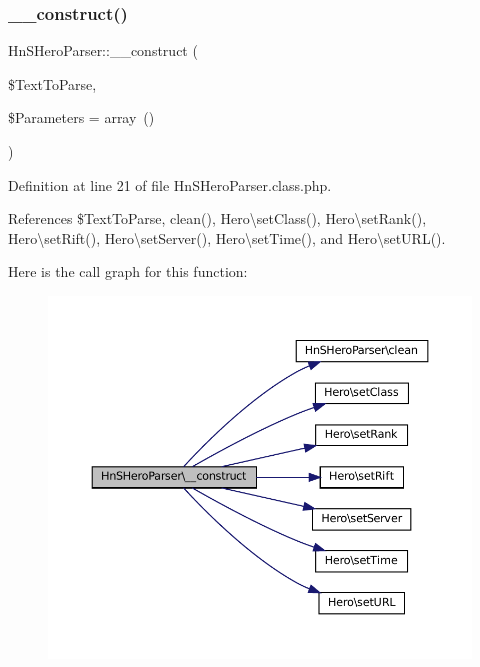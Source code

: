 \subsubsection{\texorpdfstring{\+\_\+\+\_\+construct()}{\_\_construct()}}
{\footnotesize\ttfamily Hn\+S\+Hero\+Parser\+::\+\_\+\+\_\+construct (\begin{DoxyParamCaption}\item[{}]{\$\+Text\+To\+Parse,  }\item[{}]{\$\+Parameters = {\ttfamily array~()} }\end{DoxyParamCaption})}



Definition at line 21 of file Hn\+S\+Hero\+Parser.\+class.\+php.



References \$\+Text\+To\+Parse, clean(), Hero\textbackslash{}set\+Class(), Hero\textbackslash{}set\+Rank(), Hero\textbackslash{}set\+Rift(), Hero\textbackslash{}set\+Server(), Hero\textbackslash{}set\+Time(), and Hero\textbackslash{}set\+U\+R\+L().

Here is the call graph for this function\+:\nopagebreak
\begin{figure}[H]
\begin{center}
\leavevmode
\includegraphics[width=350pt]{class_hn_s_hero_parser_abaa66274b27ad652c5cc1ec9664d6c87_cgraph}
\end{center}
\end{figure}
\mbox{\label{class_hn_s_hero_parser_a96e12afd4df5dcd65c55348a0c9a60e4}} 
